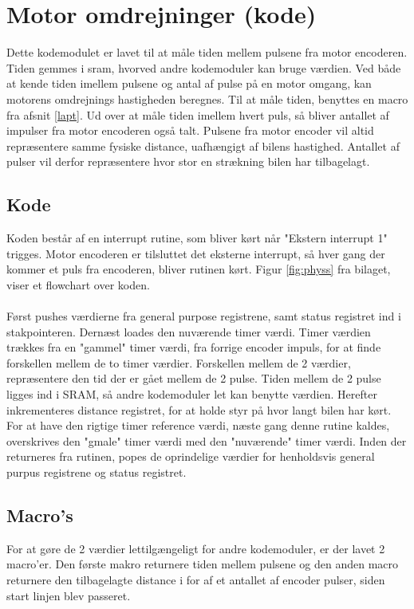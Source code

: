 \newpage

\section{Motor omdrejninger (kode)}
Dette kodemodulet er lavet til at måle tiden mellem pulsene fra motor encoderen. Tiden gemmes i sram, hvorved andre kodemoduler kan bruge værdien. Ved både at kende tiden imellem pulsene og antal af pulse på en motor omgang, kan motorens omdrejnings hastigheden beregnes. Til at måle tiden, benyttes en macro fra afsnit \ref{lapt}. Ud over at måle tiden imellem hvert puls, så bliver antallet af impulser fra motor encoderen også talt. Pulsene fra motor encoder vil altid repræsentere samme fysiske distance, uafhængigt af bilens hastighed. Antallet af pulser vil derfor repræsentere hvor stor en strækning bilen har tilbagelagt.  

\subsection{Kode}
Koden består af en interrupt rutine, som bliver kørt når "Ekstern interrupt 1" trigges. Motor encoderen er tilsluttet det eksterne interrupt, så hver gang der kommer et puls fra encoderen, bliver rutinen kørt. Figur \ref{fig:physs} fra bilaget, viser et flowchart over koden.\\
\\
Først pushes værdierne fra general purpose registrene, samt status registret ind i stakpointeren. Dernæst loades den nuværende timer værdi. Timer værdien trækkes fra en "gammel" timer værdi, fra forrige encoder impuls, for at finde forskellen mellem de to timer værdier. Forskellen mellem de 2 værdier, repræsentere den tid der er gået mellem de 2 pulse. Tiden mellem de 2 pulse ligges ind i SRAM, så andre kodemoduler let kan benytte værdien. Herefter inkrementeres distance registret, for at holde styr på hvor langt bilen har kørt. For at have den rigtige timer reference værdi, næste gang denne rutine kaldes, overskrives den "gmale" timer værdi med den "nuværende" timer værdi. Inden der returneres fra rutinen, popes de oprindelige værdier for henholdsvis general purpus registrene og status registret.

\subsection{Macro's}
For at gøre de 2 værdier lettilgængeligt for andre kodemoduler, er der lavet 2 macro'er. Den første makro returnere tiden mellem pulsene og den anden macro returnere den tilbagelagte distance i for af et antallet af encoder pulser, siden start linjen blev passeret.